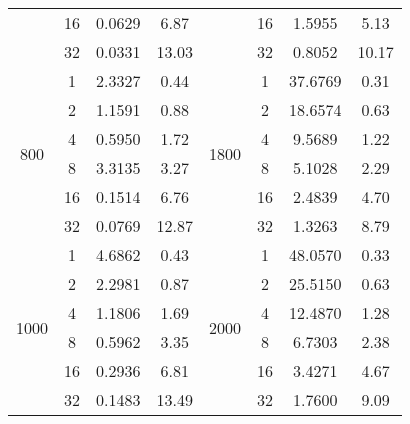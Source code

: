 \begin{tabularx}{\textwidth}{@{} c c c c || c c c c @{}}
                         & 16 & 0.0629 & 6.87  &                       & 16 & 1.5955  & 5.13  \\
                         & 32 & 0.0331 & 13.03 &                       & 32 & 0.8052  & 10.17 \\
\midrule
    \multirow{6}{*}{800} & 1  & 2.3327 & 0.44  & \multirow{6}{*}{1800} & 1  & 37.6769 & 0.31 \\
                         & 2  & 1.1591 & 0.88  &                       & 2  & 18.6574 & 0.63 \\
                         & 4  & 0.5950 & 1.72  &                       & 4  & 9.5689  & 1.22 \\
                         & 8  & 3.3135 & 3.27  &                       & 8  & 5.1028  & 2.29 \\
                         & 16 & 0.1514 & 6.76  &                       & 16 & 2.4839  & 4.70 \\
                         & 32 & 0.0769 & 12.87 &                       & 32 & 1.3263  & 8.79 \\
\midrule
    \multirow{6}{*}{1000} & 1  & 4.6862 & 0.43  & \multirow{6}{*}{2000} & 1  & 48.0570 & 0.33 \\
                          & 2  & 2.2981 & 0.87  &                       & 2  & 25.5150 & 0.63 \\
                          & 4  & 1.1806 & 1.69  &                       & 4  & 12.4870 & 1.28 \\
                          & 8  & 0.5962 & 3.35  &                       & 8  & 6.7303  & 2.38 \\
                          & 16 & 0.2936 & 6.81  &                       & 16 & 3.4271  & 4.67 \\
                          & 32 & 0.1483 & 13.49 &                       & 32 & 1.7600  & 9.09 \\
\bottomrule
\end{tabularx}
